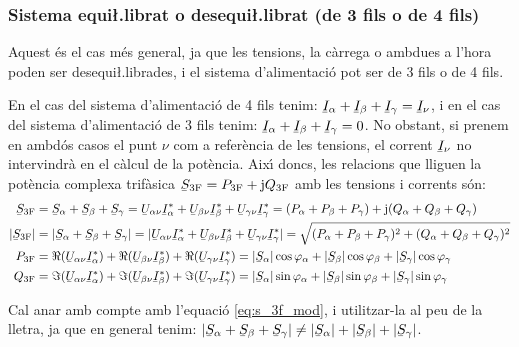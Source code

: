 \subsubsection{Sistema equi{\l.l}ibrat o desequi{\l.l}ibrat (de 3 fils o de 4 fils)}

Aquest \'{e}s el cas m\'{e}s general, ja que les tensions, la c\`{a}rrega o
ambdues a l'hora  poden ser desequi{\l.l}ibrades, i el sistema
d'alimentaci\'{o} pot ser de 3 fils o de 4 fils.

En el cas del sistema d'alimentaci\'{o} de 4 fils tenim:
$\cmplx{I}_\alpha+\cmplx{I}_\beta+\cmplx{I}_\gamma=\cmplx{I}_\nu$, i
en el cas del sistema d'alimentaci\'{o} de 3 fils tenim:
$\cmplx{I}_\alpha+\cmplx{I}_\beta+\cmplx{I}_\gamma=0$. No obstant,
si prenem en ambd\'{o}s casos el punt $\nu$ com a refer\`{e}ncia de les
tensions, el corrent $\cmplx{I}_\nu$ no intervindr\`{a} en el c\`{a}lcul de
la pot\`{e}ncia. Aix\'{\i} doncs, les relacions que lliguen la pot\`{e}ncia
complexa trif\`{a}sica $\cmplx{S}\ped{3F} = P\ped{3F} + \ju Q\ped{3F}$
amb les tensions i corrents s\'{o}n:
\begin{align}
    \cmplx{S}\ped{3F} &= \cmplx{S}_\alpha + \cmplx{S}_\beta + \cmplx{S}_\gamma =
     \cmplx{U}_{\alpha\nu} \cmplx{I}_\alpha^* +
    \cmplx{U}_{\beta\nu} \cmplx{I}_\beta^* +  \cmplx{U}_{\gamma\nu} \cmplx{I}_\gamma^* =
    (P_\alpha + P_\beta + P_\gamma) + \ju (Q_\alpha + Q_\beta + Q_\gamma) \label{eq:s_3f} \\
    |\cmplx{S}\ped{3F}| &= |\cmplx{S}_\alpha + \cmplx{S}_\beta + \cmplx{S}_\gamma| =
    |\cmplx{U}_{\alpha\nu} \cmplx{I}_\alpha^* +
    \cmplx{U}_{\beta\nu} \cmplx{I}_\beta^* +  \cmplx{U}_{\gamma\nu} \cmplx{I}_\gamma^*| =
    \sqrt{(P_\alpha + P_\beta + P_\gamma)^2 + (Q_\alpha + Q_\beta + Q_\gamma)^2} \label{eq:s_3f_mod} \\
    P\ped{3F} &= \Re(\cmplx{U}_{\alpha\nu} \cmplx{I}_\alpha^*) +
    \Re(\cmplx{U}_{\beta\nu} \cmplx{I}_\beta^*) +  \Re(\cmplx{U}_{\gamma\nu}
    \cmplx{I}_\gamma^*) = |\cmplx{S}_\alpha| \cos \varphi_\alpha + |\cmplx{S}_\beta| \cos
    \varphi_\beta + |\cmplx{S}_\gamma| \cos \varphi_\gamma \\
    Q\ped{3F} &= \Im(\cmplx{U}_{\alpha\nu} \cmplx{I}_\alpha^*) +
    \Im(\cmplx{U}_{\beta\nu} \cmplx{I}_\beta^*) +  \Im(\cmplx{U}_{\gamma\nu}
    \cmplx{I}_\gamma^*) = |\cmplx{S}_\alpha| \sin \varphi_\alpha + |\cmplx{S}_\beta| \sin
    \varphi_\beta + |\cmplx{S}_\gamma| \sin \varphi_\gamma
\end{align}

Cal anar amb compte amb l'equaci\'{o} \eqref{eq:s_3f_mod}, i utilitzar-la al
peu de la lletra, ja
que en general tenim: $|\cmplx{S}_\alpha + \cmplx{S}_\beta + \cmplx{S}_\gamma| \neq
|\cmplx{S}_\alpha| + |\cmplx{S}_\beta| + |\cmplx{S}_\gamma|$.


